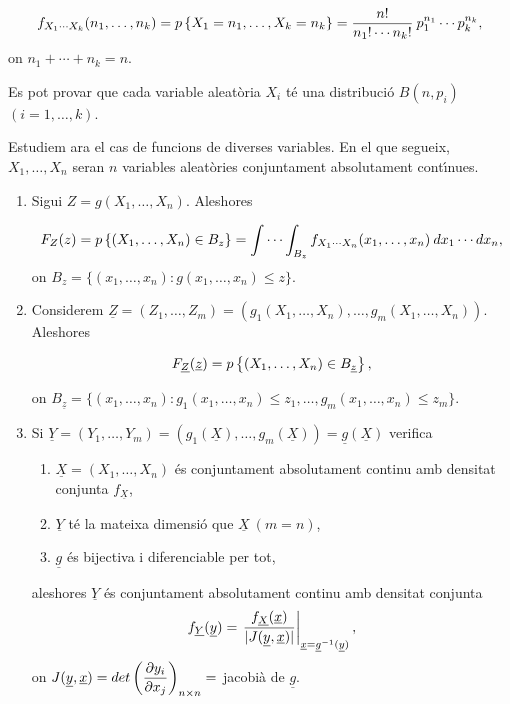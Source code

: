 $$f_{X_1 \cdots X_k}(n_1, \ldots , n_k) = 
p\left\{X_1 = n_1, \ldots , X_k = n_k\right\} = {n!\over n_1! \cdots n_k!} \> p_1^{n_1} \cdots p_k^{n_k},$$
on $n_1 + \cdots + n_k = n$.

Es pot provar que cada variable aleat\`oria $X_i$ t\'e una distribuci\'o
$B(n,p_i)$\break $(i= 1, \ldots , k)$.

Estudiem ara el cas de funcions de diverses variables.
En el que segueix, $X_1, \ldots , X_n$ seran
$n$ variables aleat\`ories conjuntament absolutament cont\'{\i}nues.

\begin{enumerate}

\item Sigui $Z = g(X_1, \ldots , X_n)$. Aleshores

$$F_Z(z) = p\left\{(X_1, \ldots , X_n) \in B_z\right\} = \int \cdots \int_{B_z} f_{X_1 \cdots
X_n}(x_1, \ldots , x_n) \> dx_1 \cdots dx_n,$$
on $B_z = \{ (x_1, \ldots , x_n) : g(x_1, \ldots , x_n) \leq z \}$.

\item Considerem $\underline{Z} = (Z_1, \ldots , Z_m) = (g_1(X_1, \ldots , X_n),
\ldots , g_m(X_1, \ldots , X_n))$. Aleshores

$$F_{\underline{Z}}(\underline{z}) = p\left\{(X_1, \ldots , X_n) \in
B_{\underline{z}}\right\},$$

on $B_{\underline{z}} = \{ (x_1, \ldots , x_n) : g_1(x_1, \ldots , x_n) \leq z_1,
\ldots , g_m(x_1, \ldots , x_n) \leq z_m \}$.

\item Si $\underline{Y} = (Y_1, \ldots , Y_m) = (g_1(\underline{X}), \ldots ,
g_m(\underline{X})) = \underline{g}(\underline{X})$ verifica

\begin{enumerate}

\item $\underline{X} = (X_1, \ldots , X_n)$ \'es conjuntament absolutament
continu
amb densitat conjunta $f_{\underline{X}}$,
\item $\underline{Y}$ t\'e la mateixa dimensi\'o que $\underline{X} \ (m=n)$,

\item $\underline{g}$ \'es bijectiva i diferenciable per tot,
\end{enumerate}
aleshores $\underline{Y}$ \'es conjuntament absolutament continu amb densitat
conjunta
$$f_{\underline{Y}}(\underline{y}) = \left. {f_{\underline{X}}(\underline{x})
\over |J(\underline{y}, \underline{x})|} \right|_{\underline{x} =
\underline{g}^{-1}(\underline{y})},$$
on $\displaystyle J(\underline{y}, \underline{x}) = det \left({\partial y_i \over
\partial x_j}\right)_{n \times n} =$ jacobi\`a de $\underline{g}$.


\end{enumerate}
